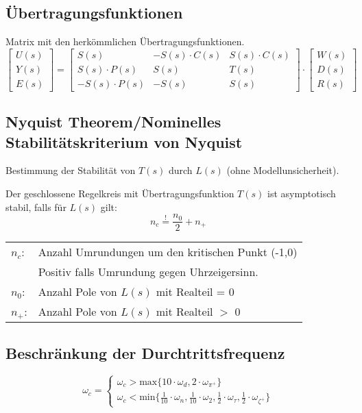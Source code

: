 \subsection{Übertragungsfunktionen}
    Matrix mit den herkömmlichen Übertragungsfunktionen.
    \begin{equation*}
        \begin{bmatrix}
            U(s)\\Y(s)\\E(s)
        \end{bmatrix}
        =
        \begin{bmatrix}
            S(s)    &   -S(s)\cdot C(s) &   S(s)\cdot C(s)\\
            S(s)\cdot P(s)  &   S(s)    &   T(s)\\
            -S(s)\cdot P(s) &   -S(s)   &   S(s)
        \end{bmatrix}
        \cdot
        \begin{bmatrix}
            W(s)\\D(s)\\R(s)
        \end{bmatrix}
    \end{equation*}
    
\subsection{Nyquist Theorem/Nominelles Stabilitätskriterium von Nyquist}
    Bestimmung der Stabilität von $T(s)$ durch $L(s)$ (ohne Modellunsicherheit).
            
    Der geschlossene Regelkreis mit Übertragungsfunktion $T(s)$ ist asymptotisch stabil, falls für $L(s)$ gilt:
        \begin{equation*}
            n_c\overset{!}{=}\frac{n_0}{2}+n_+
        \end{equation*}
        \begin{tabular}{l l}
            $n_c$:  & Anzahl Umrundungen um den kritischen Punkt (-1,0)  \\
                    & Positiv falls Umrundung gegen Uhrzeigersinn.\\
            $n_0$:  & Anzahl Pole von $L(s)$ mit Realteil = 0\\
            $n_+$:  & Anzahl Pole von $L(s)$ mit Realteil $>$ 0
        \end{tabular}
  
 \subsection{Beschränkung der Durchtrittsfrequenz}
    \begin{equation*}
        \boxed{\omega_c = 
        \begin{cases}
        \omega_c > \textrm{max}\{10\cdot\omega_d, 2\cdot\omega_{\pi^+}\}\\
        \omega_c < \textrm{min}\{\frac{1}{10}\cdot\omega_n, \frac{1}{10}\cdot \omega_2, \frac{1}{2}\cdot \omega_\tau, \frac{1}{2}\cdot \omega_{\zeta^+}\}
        \end{cases}
        }
    \end{equation*} 
    
